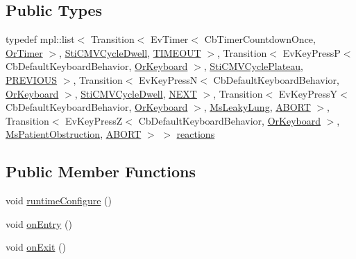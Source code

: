 \subsection*{Public Types}
\begin{DoxyCompactItemize}
\item 
typedef mpl\+::list$<$ Transition$<$ Ev\+Timer$<$ Cb\+Timer\+Countdown\+Once, \hyperlink{classsm__respira__1_1_1OrTimer}{Or\+Timer} $>$, \hyperlink{structsm__respira__1_1_1cmv__cycle__inner__states_1_1StiCMVCycleDwell}{Sti\+C\+M\+V\+Cycle\+Dwell}, \hyperlink{structsm__respira__1_1_1cmv__cycle__inner__states_1_1StiCMVCycleExpire_1_1TIMEOUT}{T\+I\+M\+E\+O\+UT} $>$, Transition$<$ Ev\+Key\+PressP$<$ Cb\+Default\+Keyboard\+Behavior, \hyperlink{classsm__respira__1_1_1OrKeyboard}{Or\+Keyboard} $>$, \hyperlink{structsm__respira__1_1_1cmv__cycle__inner__states_1_1StiCMVCyclePlateau}{Sti\+C\+M\+V\+Cycle\+Plateau}, \hyperlink{structsm__respira__1_1_1cmv__cycle__inner__states_1_1StiCMVCycleExpire_1_1PREVIOUS}{P\+R\+E\+V\+I\+O\+US} $>$, Transition$<$ Ev\+Key\+PressN$<$ Cb\+Default\+Keyboard\+Behavior, \hyperlink{classsm__respira__1_1_1OrKeyboard}{Or\+Keyboard} $>$, \hyperlink{structsm__respira__1_1_1cmv__cycle__inner__states_1_1StiCMVCycleDwell}{Sti\+C\+M\+V\+Cycle\+Dwell}, \hyperlink{structsm__respira__1_1_1cmv__cycle__inner__states_1_1StiCMVCycleExpire_1_1NEXT}{N\+E\+XT} $>$, Transition$<$ Ev\+Key\+PressY$<$ Cb\+Default\+Keyboard\+Behavior, \hyperlink{classsm__respira__1_1_1OrKeyboard}{Or\+Keyboard} $>$, \hyperlink{classsm__respira__1_1_1MsLeakyLung}{Ms\+Leaky\+Lung}, \hyperlink{classABORT}{A\+B\+O\+RT} $>$, Transition$<$ Ev\+Key\+PressZ$<$ Cb\+Default\+Keyboard\+Behavior, \hyperlink{classsm__respira__1_1_1OrKeyboard}{Or\+Keyboard} $>$, \hyperlink{classsm__respira__1_1_1MsPatientObstruction}{Ms\+Patient\+Obstruction}, \hyperlink{classABORT}{A\+B\+O\+RT} $>$ $>$ \hyperlink{structsm__respira__1_1_1cmv__cycle__inner__states_1_1StiCMVCycleExpire_a372e595223d128c8512be88c04bd28af}{reactions}
\end{DoxyCompactItemize}
\subsection*{Public Member Functions}
\begin{DoxyCompactItemize}
\item 
void \hyperlink{structsm__respira__1_1_1cmv__cycle__inner__states_1_1StiCMVCycleExpire_a6a64c780289282ecfe48072f04077b4e}{runtime\+Configure} ()
\item 
void \hyperlink{structsm__respira__1_1_1cmv__cycle__inner__states_1_1StiCMVCycleExpire_a8970275dfac3a6981f24603ba17d5f57}{on\+Entry} ()
\item 
void \hyperlink{structsm__respira__1_1_1cmv__cycle__inner__states_1_1StiCMVCycleExpire_a6f91224b806ce0146d156d4ff81c4064}{on\+Exit} ()
\end{DoxyCompactItemize}
